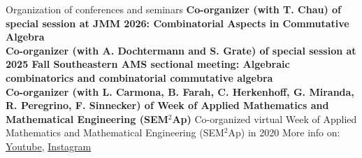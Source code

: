 \documentclass[12pt]{resume} %
\begin{document}


\begin{rSection}{Organization of conferences and seminars}
{\bf Co-organizer (with T. Chau) of special session at JMM 2026: Combinatorial Aspects in Commutative Algebra}
\\[1mm]
{\bf Co-organizer (with A. Dochtermann and S. Grate) of special session at 2025 Fall Southeastern AMS sectional meeting: Algebraic combinatorics and combinatorial commutative algebra}
\\[1mm]
{\bf Co-organizer (with L. Carmona, B. Farah, C. Herkenhoff, G. Miranda, R. Peregrino, F. Sinnecker) of Week of Applied Mathematics and Mathematical Engineering (SEM$^2$Ap)}
Co-organized virtual Week of Applied Mathematics and Mathematical Engineering (SEM$^2$Ap) in 2020
{\scriptsize More info on: \href{https://www.youtube.com/channel/UC14NMQ5cOsSuLrAQGGa2T4Q}{Youtube}, 
\href{https://www.instagram.com/semap.rio/}{Instagram}}
\\[1mm]
\end{rSection}



\end{document}
